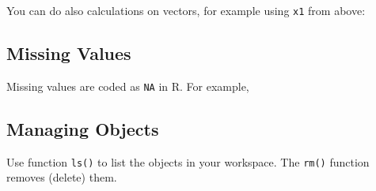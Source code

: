 \documentclass[letterpaperpaper,9pt,twocolumn,twoside,printwatermark=false]{pinp}
\begin{document}
You can do also calculations on vectors, for example using \texttt{x1}
from above:

\begin{Shaded}
\begin{Highlighting}[]
\OperatorTok{*}\StringTok{ }
\NormalTok{(}\OperatorTok{*}\NormalTok{), }\NormalTok{)}
\end{Highlighting}
\end{Shaded}

\hypertarget{missing-values}{%
\subsection{Missing Values}\label{missing-values}}

Missing values are coded as \texttt{NA} in R. For example,

\begin{Shaded}
\begin{Highlighting}[]
\StringTok{ }\NormalTok{(}\NormalTok{, }\NormalTok{, }\NormalTok{, }\NormalTok{, }\NormalTok{, }\NormalTok{) }
\StringTok{ }\NormalTok{(}\NormalTok{, }\NormalTok{, }\NormalTok{, }\NormalTok{)}
\end{Highlighting}
\end{Shaded}

\hypertarget{managing-objects}{%
\subsection{Managing Objects}\label{managing-objects}}

Use function \texttt{ls()} to list the objects in your workspace. The
\texttt{rm()} function removes (delete) them.

\begin{Shaded}
\begin{Highlighting}[]
\NormalTok{()}
\end{Highlighting}
\end{Shaded}
\end{document}
